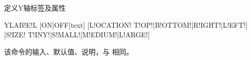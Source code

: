 \label{cmd:ylabel}

定义Y轴标签及属性

\begin{SACSTX}
YLAB!E!L [ON|OFF|text] [L!OCATION! T!OP!|B!OTTOM!|R!IGHT!|L!EFT!]
    [S!IZE! T!INY!|S!MALL!|M!EDIUM!|L!ARGE!]
\end{SACSTX}

该命令的输入、默认值、说明，与  相同。
